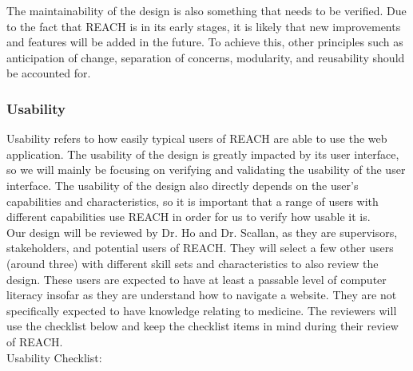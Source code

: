 \documentclass[12pt, titlepage]{article}
\begin{document}
The maintainability of the design is also something that needs to be verified. Due to the fact 
that REACH is in its early stages, it is likely that new improvements and features will be added 
in the future. To achieve this, other principles such as anticipation of change, separation of 
concerns, modularity, and reusability should be accounted for.

\subsubsection{Usability}

Usability refers to how easily typical users of REACH are able to use the web application. The 
usability of the design is greatly impacted by its user interface, so we will mainly be focusing 
on verifying and validating the usability of the user interface. The usability of the design also 
directly depends on the user's capabilities and characteristics, so it is important that a range 
of users with different capabilities use REACH in order for us to verify how usable it is.\\

Our design will be reviewed by Dr. Ho and Dr. Scallan, as they are supervisors, stakeholders, and 
potential users of REACH. They will select a few other users (around three) with different 
skill sets and characteristics to also review the design. These users are expected to have at least a passable level of computer literacy insofar as they are understand how to navigate a website. They are not specifically expected to have knowledge relating to medicine. The reviewers will use the checklist 
below and keep the checklist items in mind during their review of REACH.\\

\noindent Usability Checklist:
\end{document}
